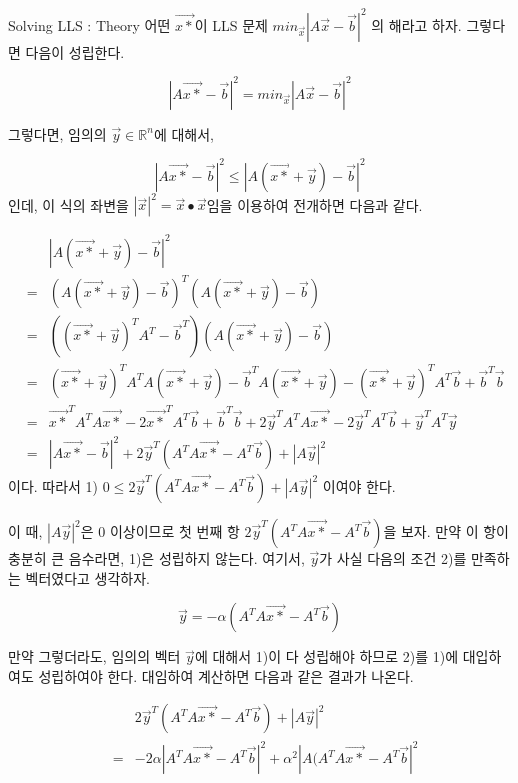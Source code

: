 \documentclass{beamer}
\begin{document}
\begin{frame}[allowframebreaks]{Solving LLS : Theory} 
어떤 $\vec{x*}$이 LLS 문제 $ min_{\vec{x}} |A\vec{x} - \vec{b}|^2 $ 의 해라고 하자. 그렇다면 다음이 성립한다. 

\begin{equation} 
|A\vec{x*} - \vec{b}|^2  = min_{\vec{x}} |A\vec{x} - \vec{b}|^2 
\end{equation}

그렇다면, 임의의 $\vec{y} \in \mathds{R}^n$에 대해서, 

\begin{equation}
|A\vec{x*} - \vec{b}|^2  \leq |A(\vec{x*} + \vec{y}) - \vec{b}|^2 
\end{equation}
인데, 이 식의 좌변을 $|\vec{x}|^2 = \vec{x} \bullet \vec{x}$임을 이용하여 전개하면 다음과 같다. 

\begin{eqnarray*} 
&&|A(\vec{x*} + \vec{y}) - \vec{b}|^2  \\
&=& (A(\vec{x*} + \vec{y}) - \vec{b})^T (A(\vec{x*} + \vec{y}) - \vec{b}) \\ 
&=& ((\vec{x*} + \vec{y})^T A^T - \vec{b}^T) (A(\vec{x*} + \vec{y}) - \vec{b}) \\ 
&=& (\vec{x*} + \vec{y})^T A^T A(\vec{x*} + \vec{y}) - \vec{b}^T A(\vec{x*} + \vec{y}) -  (\vec{x*} + \vec{y})^T A^T \vec{b} + \vec{b}^T \vec{b} \\
&=& \vec{x*}^T A^T A\vec{x*} - 2\vec{x*}^T A^T \vec{b} + \vec{b}^T \vec{b} + 2\vec{y}^T A^T A\vec{x*} - 2\vec{y}^T A^T \vec{b} + \vec{y}^T A^T \vec{y} \\ 
&=& |A\vec{x*}-\vec{b}|^2 + 2\vec{y}^T (A^T A\vec{x*} -A^T\vec{b}) + |A\vec{y}|^2
\end{eqnarray*}
이다. 따라서 1) $0 \leq 2\vec{y}^T (A^T A\vec{x*} -A^T\vec{b}) + |A\vec{y}|^2$ 이여야 한다. 

이 때, $|A\vec{y}|^2$은 0 이상이므로 첫 번째 항 $2\vec{y}^T (A^T A\vec{x*} -A^T\vec{b})$을 보자. 만약 이 항이 충분히 큰 음수라면, 1)은 성립하지 않는다. 여기서,  $\vec{y}$가 사실 다음의 조건 2)를 만족하는 벡터였다고 생각하자. 

\begin{equation} 
\vec{y} = - \alpha (A^T A \vec{x*} - A^T \vec{b})
\end{equation} 

만약 그렇더라도, 임의의 벡터 $\vec{y}$에 대해서 1)이 다 성립해야 하므로 2)를 1)에 대입하여도 성립하여야 한다. 대임하여 계산하면 다음과 같은 결과가 나온다. 

\begin{eqnarray} 
&&2\vec{y}^T (A^T A\vec{x*} -A^T\vec{b}) + |A\vec{y}|^2 \\
&=& -2 \alpha |A^T A\vec{x*} - A^T \vec{b}|^2 + \alpha^2 |A(A^T A \vec{x*} - A^T \vec{b}|^2  
\end{eqnarray}


\end{frame}
\end{document}
